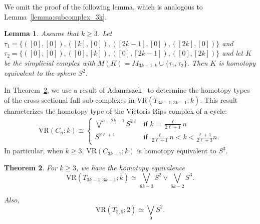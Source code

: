 \documentclass[12pt,a4paper]{amsart}
\newtheorem{theorem}{Theorem}[section]
\newtheorem{lemma}[theorem]{Lemma}
\theoremstyle{definition}
\newcommand{\vr}[2]{\mathrm{VR}(#1;#2)}
\numberwithin{equation}{section}
\begin{document}
We omit the proof of the following lemma, which is analogous to Lemma~\ref{lemma:subcomplex_3k}.

\begin{lemma}
\label{lemma:subcomplex_3k-1}
Assume that $k\geq 3$.
Let $\tau_1=\{([0], [0]), ([k], [0]), ([2k-1], [0]), ([2k], [0]) \}$ and $\tau_2=\{([0], [0]), ([0], [k]), ([0], [2k-1]), ([0], [2k])\}$ and let $K$ be the simplicial complex with $M(K) = M_{3k-1,k}\cup \{\tau_1, \tau_2\}$.
Then $K$ is homotopy equivalent to the sphere $S^2$.
\end{lemma}

In Theorem~\ref{thm:homotopy_3k-1}, we use a result of Adamaszek~\cite[Corollary 6.7]{Adamaszek2013} to determine the homotopy types of the cross-sectional full sub-complexes in $\vr{T_{3k-1,3k-1}}{k}$.
This result characterizes the homotopy type of the Vietoris-Rips complex of a cycle:
\begin{align*}
\vr{C_n}{k} \cong 
\begin{cases}
\bigvee^{n-2k-1}S^{2\ell} & \text{if } k =\frac{\ell}{2\ell+1}n \\
S^{2\ell+1} &\text{if } \frac{\ell}{2\ell+1}n<k<\frac{\ell+1}{2\ell+3}n.
\end{cases}
\end{align*}
In particular, when $k\geq 3$, $\vr{C_{3k-1}}{k}$ is homotopy equivalent to $S^3$.


\begin{theorem}
\label{thm:homotopy_3k-1}
For $k\geq 3$, we have the homotopy equivalence
\[\vr{T_{3k-1,3k-1}}{k}\simeq \bigvee_{6k-3} S^2\vee \bigvee_{6k-2}S^3.\] 

Also, \[\vr{T_{5,5}}{2} \simeq \bigvee_{9}S^2.\] 
\label{thm:S2S3}
\end{theorem}
\end{document}
